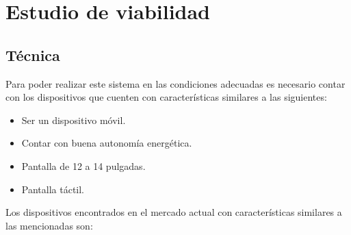 \section{Estudio de viabilidad}

\subsection{Técnica}
Para poder realizar este sistema en las condiciones adecuadas es necesario contar con los dispositivos  que cuenten con características similares a las siguientes:\\

\begin{itemize}
    \item Ser un dispositivo móvil.
    \item Contar con buena autonomía energética.
    \item Pantalla de 12 a 14 pulgadas.
    \item Pantalla táctil.
\end{itemize}

Los dispositivos encontrados en el mercado actual con características similares a las mencionadas son:\\

